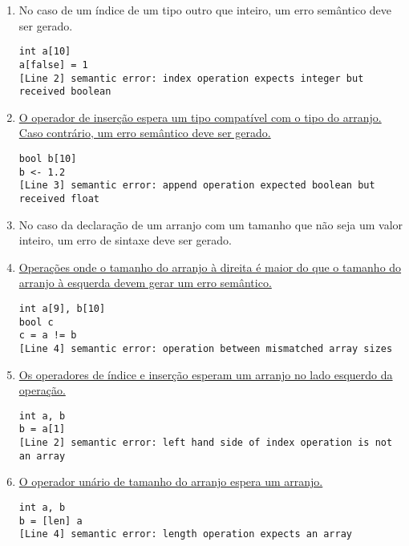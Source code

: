 \documentclass{article}
\newenvironment{smallenum}{
    \vspace{-1mm}
    \begin{enumerate}[label=\roman*.]
    \setlength{\parskip}{0pt}
    \setlength{\itemsep}{2pt}
}{
    \vspace{-2mm}
    \end{enumerate}
}
\begin{document}
\begin{smallenum}

\item No caso de um índice de um tipo outro que inteiro, um erro semântico
    deve ser gerado.

\begin{verbatim}
int a[10]
a[false] = 1
[Line 2] semantic error: index operation expects integer but received boolean
\end{verbatim}

\item \uline{O operador de inserção espera um tipo compatível com o tipo do
    arranjo. Caso contrário, um erro semântico deve ser gerado.}

\begin{verbatim}
bool b[10]
b <- 1.2
[Line 3] semantic error: append operation expected boolean but received float
\end{verbatim}

\item No caso da declaração de um arranjo com um tamanho que não seja um
    valor inteiro, um erro de sintaxe deve ser gerado.

\item \uline{Operações onde o tamanho do arranjo à direita é maior do que
    o tamanho do arranjo à esquerda devem gerar um erro semântico.}

\begin{verbatim}
int a[9], b[10]
bool c
c = a != b
[Line 4] semantic error: operation between mismatched array sizes
\end{verbatim}

\item \uline{Os operadores de índice e inserção esperam um arranjo no lado
    esquerdo da operação.}

\begin{verbatim}
int a, b
b = a[1]
[Line 2] semantic error: left hand side of index operation is not an array
\end{verbatim}

\item \uline{O operador unário de tamanho do arranjo espera um arranjo.}

\begin{verbatim}
int a, b
b = [len] a
[Line 4] semantic error: length operation expects an array
\end{verbatim}

\end{smallenum}
\end{document}
